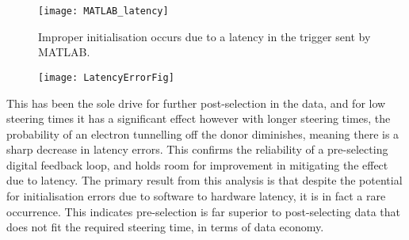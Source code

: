 	\begin{figure}[htbp!]
		\centering
		\texttt{[image: MATLAB\_latency]}
		\caption{Improper initialisation occurs due to a latency in the trigger sent by MATLAB.}
		\label{fig::latency}
	\end{figure}
	
	\begin{figure}[htbp]
		\centering
		\texttt{[image: LatencyErrorFig]}
		\caption{}
		\label{fig::latency_errors}
	\end{figure}
	
	This has been the sole drive for further post-selection in the data, and for low steering times it has a significant effect however with longer steering times, the probability of an electron tunnelling off the donor diminishes, meaning there is a sharp decrease in latency errors. This confirms the reliability of a pre-selecting digital feedback loop, and holds room for improvement in mitigating the effect due to latency. The primary result from this analysis is that despite the potential for initialisation errors due to software to hardware latency, it is in fact a rare occurrence. This indicates pre-selection is far superior to post-selecting data that does not fit the required steering time, in terms of data economy. 

	